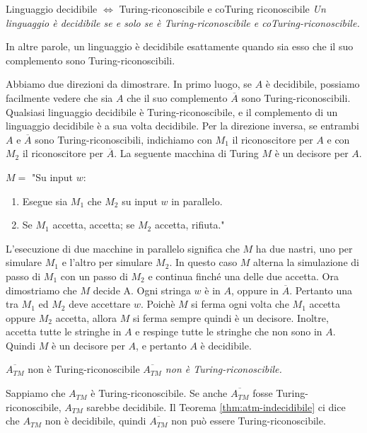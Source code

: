 \begin{Thm}{Linguaggio decidibile $\iff$ Turing-riconoscibile e coTuring riconoscibile}{}
\textit{Un linguaggio è decidibile se e solo se è Turing-riconoscibile e coTuring-riconoscibile.}

In altre parole, un linguaggio è decidibile esattamente quando sia esso che il suo complemento sono Turing-riconoscibili.

\begin{demonstration}
Abbiamo due direzioni da dimostrare. In primo luogo, se $A$ è decidibile, possiamo facilmente vedere che sia $A$ che il suo complemento $\overline{A}$ sono Turing-riconoscibili. Qualsiasi linguaggio decidibile è Turing-riconoscibile, e il complemento di un linguaggio decidibile è a sua volta decidibile. Per la direzione inversa, se entrambi $A$ e $\overline{A}$ sono Turing-riconoscibili, indichiamo con $M_{1}$ il riconoscitore per $A$ e con $M_{2}$ il riconoscitore per $\overline{A}$. La seguente macchina di Turing $M$ è un decisore per $A$.

$M =$ "Su input $w$:
\begin{enumerate}
    \item Esegue sia $M_{1}$ che $M_{2}$ su input $w$ in parallelo.
    \item Se $M_{1}$ accetta, accetta; se $M_{2}$ accetta, rifiuta."
\end{enumerate}
L'esecuzione di due macchine in parallelo significa che $M$ ha due nastri, uno per simulare $M_{1}$ e l'altro per simulare $M_{2}$. In questo caso $M$ alterna la simulazione di passo di $M_{1}$ con un passo di $M_{2}$ e continua finché una delle due accetta. Ora dimostriamo che $M$ decide A. Ogni stringa $w$ è in $A$, oppure in $\overline{A}$. Pertanto una tra $M_{1}$ ed $M_{2}$ deve accettare $w$. Poichè $M$ si ferma ogni volta che $M_{1}$ accetta oppure $M_{2}$ accetta, allora $M$ si ferma sempre quindi è un decisore. Inoltre, accetta tutte le stringhe in $A$ e respinge tutte le stringhe che non sono in $A$. Quindi $M$ è un decisore per $A$, e pertanto $A$ è decidibile.
\end{demonstration}
\end{Thm}

\begin{Corollario}{$\overline{A_{TM}}$ non è Turing-riconoscibile}{}
\textit{$\overline{A_{TM}}$ non è Turing-riconoscibile.}

\begin{demonstration}
Sappiamo che $A_{TM}$ è Turing-riconoscibile. Se anche $\overline{A_{TM}}$ fosse Turing-riconoscibile, $A_{TM}$ sarebbe decidibile. Il Teorema \ref{thm:atm-indecidibile} ci dice che $A_{TM}$ non è decidibile, quindi $\overline{A_{TM}}$ non può essere Turing-riconoscibile.    
\end{demonstration}
\end{Corollario}
